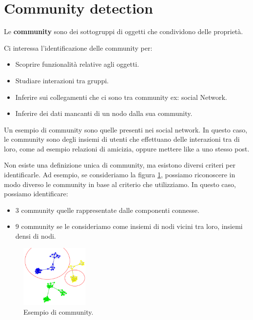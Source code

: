 \section{Community detection}
\begin{definizione}
    Le \textbf{community} sono dei sottogruppi di oggetti che condividono delle
    proprietà.
\end{definizione}
Ci interessa l'identificazione delle community per:
\begin{itemize}
    \item Scoprire funzionalità relative agli oggetti.
    \item Studiare interazioni tra gruppi.
    \item Inferire sui collegamenti che ci sono tra community ex: social Network.
    \item Inferire dei dati mancanti di un nodo dalla sua community.
\end{itemize}
\begin{esempio}
    Un esempio di community sono quelle presenti nei social network. In questo caso,
    le community sono degli insiemi di utenti che effettuano delle interazioni
    tra di loro, come ad esempio relazioni di amicizia, oppure mettere like a
    uno stesso post.
\end{esempio}
Non esiste una definizione unica di community, ma esistono diversi criteri per
identificarle. Ad esempio, se consideriamo la figura \ref{fig:community}, possiamo
riconoscere in modo diverso le community in base al criterio che utilizziamo.
In questo caso, possiamo identificare:
\begin{itemize}
    \item 3 community quelle rappresentate dalle componenti connesse.
    \item 9 community se le consideriamo come insiemi di nodi vicini tra loro,
          insiemi densi di nodi.
\end{itemize}
\begin{figure}[!ht]
    \centering
    \includegraphics[width=0.3\textwidth]{./img/net/community.png}
    \caption{Esempio di community.}
    \label{fig:community}
\end{figure}

